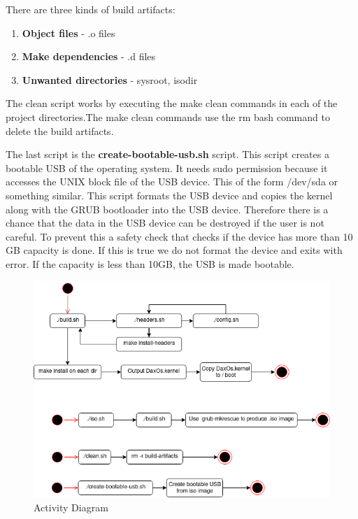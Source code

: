 \begin{flushleft}
	There are three kinds of build artifacts:
	\begin{enumerate}
		\item  \textbf{Object files} - .o files
		\item  \textbf{Make dependencies} - .d files
		\item  \textbf{Unwanted directories} - sysroot, isodir
	\end{enumerate}

	The clean script works by executing the make clean commands in each of the
	project directories.The make clean commands use the rm bash command to delete
	the build artifacts.
	
	\vspace{1.5 cm}
	
	The last script is the \textbf{create-bootable-usb.sh} script. This script
	creates a bootable USB of the operating system. It needs sudo permission because it accesses the
	UNIX block file of the USB device. This of the form /dev/sda or something similar. 
	This script formats the USB device and copies the kernel along with the GRUB bootloader into the USB device. 
	Therefore there is a chance that the data in the USB device can be destroyed if the user is not careful.
	To prevent this a safety check that checks if the device has more than 10 GB capacity is done. If this
	is true we do not format the device and exits with error. If the capacity is less than 10GB, the USB is made bootable.
	

	
\end{flushleft}

\begin{figure}[h!]
	\includegraphics[width=\textwidth,height=\textheight,keepaspectratio]{activity}
	\caption{Activity Diagram}
\end{figure}

